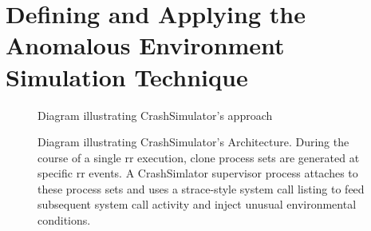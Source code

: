 \section{Defining and Applying the Anomalous Environment Simulation Technique}
\label{SEC:approach}

\begin{figure}[t]
  \center{}
  \caption{Diagram illustrating CrashSimulator's approach}
  \label{figure:approach}
\end{figure}

\begin{figure}[t]
  \center{}
  \caption{Diagram illustrating CrashSimulator's Architecture.  During the
    course of a single rr execution, clone process sets are generated at
    specific rr events.  A CrashSimlator supervisor process attaches to
    these process sets and uses a strace-style system call listing to feed
    subsequent system call activity and inject unusual environmental
    conditions.}
  \label{figure:architecture}
\end{figure}

